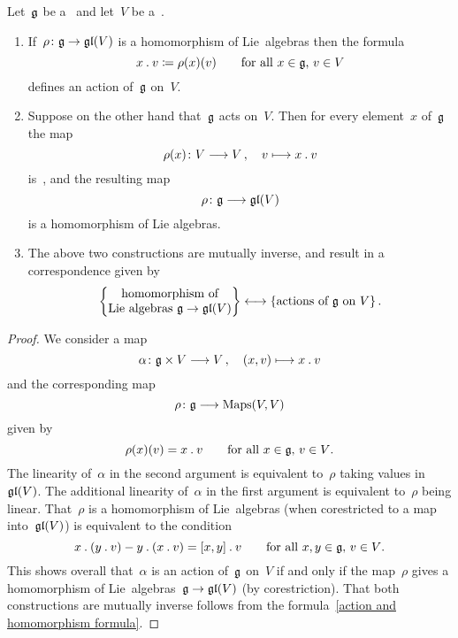 \begin{proposition}
  \label{correspodence between representations and actions}
  Let~$\mathfrak{g}$ be a~\liealgebra{$\kf$} and let~$V$ be a~\vectorspace{$\kf$}.
  \begin{enumerate}
    \item
      If~$\rho \colon \glie \to \gllie(V)$ is a homomorphism of Lie~algebras then the formula
      \[
        x \mathbin{.} v \coloneqq \rho(x)(v)
        \qquad
        \text{for all~$x \in \mathfrak{g}$,~$v \in V$}
      \]
      defines an action of~$\mathfrak{g}$ on~$V$.
    \item
      Suppose on the other hand that~$\mathfrak{g}$ acts on~$V$.
      Then for every element~$x$ of~$\mathfrak{g}$ the map
      \[
        \rho(x) \colon V \to V \,,
        \quad
        v \mapsto x \act v
      \]
      is~\linear{$\kf$}, and the resulting map
      \[
        \rho \colon \glie \to \gllie(V)
      \]
      is a homomorphism of Lie algebras.
    \item
      The above two constructions are mutually inverse, and result in a {\onetoonetext} correspondence given by
      \[
        \left\{
          \begin{tabular}{@{}c@{}}
            homomorphism of
            \\
            Lie~algebras~$\glie \to \gllie(V)$
          \end{tabular}
        \right\}
        \onetoone
        \{
          \text{actions of~$\glie$ on~$V$}
        \} \,.
      \]
  \end{enumerate}
\end{proposition}


\begin{proof}
  We consider a map
  \[
    \alpha
    \colon
    \glie \times V
    \to
    V \,,
    \quad
    (x,v)
    \mapsto
    x \act v
  \]
  and the corresponding map
  \[
    \rho
    \colon
    \glie
    \to
    \Maps(V,V)
  \]
  given by
  \begin{equation}
    \label{action and homomorphism formula}
    \rho(x)(v) = x \mathbin{.} v
    \qquad
    \text{for all~$x \in \mathfrak{g}$,~$v \in V$.}
  \end{equation}
  The linearity of~$\alpha$ in the second argument is equivalent to~$\rho$ taking values in~$\mathfrak{gl}(V)$.
  The additional linearity of~$\alpha$ in the first argument is equivalent to~$\rho$ being linear.
  That~$\rho$ is a homomorphism of Lie~algebras (when corestricted to a map into~$\mathfrak{gl}(V)$) is equivalent to the condition
  \[
    x \mathbin{.} (y \mathbin{.} v) - y \mathbin{.} (x \mathbin{.} v)
    =
    [x,y] \mathbin{.} v
    \qquad
    \text{for all~$x, y \in \mathfrak{g}$,~$v \in V$.}
  \]
  This shows overall that~$\alpha$ is an action of~$\mathfrak{g}$ on~$V$ if and only if the map~$\rho$ gives a homomorphism of Lie~algebras~$\glie \to \gllie(V)$ (by corestriction).
  That both constructions are mutually inverse follows from the formula~\eqref{action and homomorphism formula}.
\end{proof}


